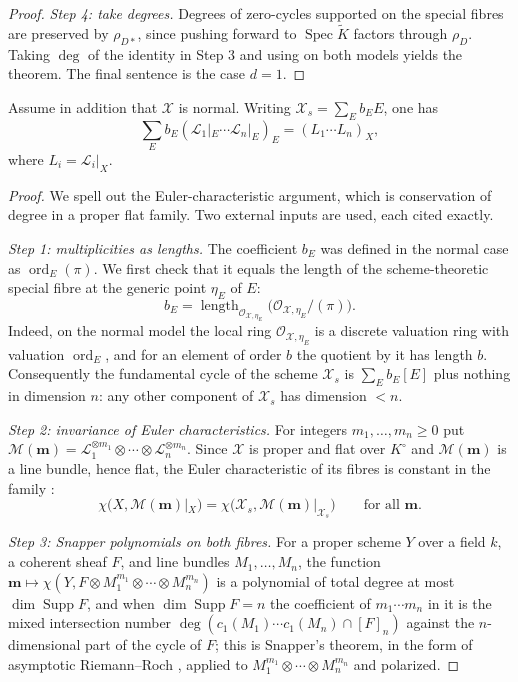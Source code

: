 \begin{proof}
\emph{Step 4: take degrees.}  Degrees of zero-cycles supported on the
special fibres are preserved by $\rho_{D*}$, since pushing forward to
$\operatorname{Spec}\widetilde K$ factors through $\rho_D$.  Taking
$\deg$ of the identity in Step 3 and using
 on both models yields the theorem.
The final sentence is the case $d=1$.
\end{proof}

\begin{proposition}\label{prop:special-fibre-degree-conservation}
Assume in addition that $\mathcal X$ is normal.
Writing $\mathcal X_s=\sum_Eb_EE$, one has
\[
 \sum_Eb_E(\mathcal L_1|_E\cdots\mathcal L_n|_E)_E
   = (L_1\cdots L_n)_X,
\]
where $L_i=\mathcal L_i|_X$.
\end{proposition}
\begin{proof}
We spell out the Euler-characteristic argument, which is conservation of
degree in a proper flat family.  Two external inputs are used, each cited
exactly.

\emph{Step 1: multiplicities as lengths.}  The coefficient $b_E$ was
defined in the normal case as $\operatorname{ord}_E(\pi)$.  We first check
that it equals the length of the scheme-theoretic special fibre at the
generic point $\eta_E$ of $E$:
\[
 b_E=\operatorname{length}_{\mathcal O_{\mathcal X,\eta_E}}
     \bigl(\mathcal O_{\mathcal X,\eta_E}/(\pi)\bigr).
\]
Indeed, on the normal model the local ring $\mathcal O_{\mathcal
X,\eta_E}$ is a discrete valuation ring with valuation
$\operatorname{ord}_E$, and for an element of order $b$ the quotient by it
has length $b$.  Consequently the fundamental cycle of the scheme
$\mathcal X_s$ is $\sum_Eb_E[E]$ plus nothing in dimension $n$: any other
component of $\mathcal X_s$ has dimension $<n$.

\emph{Step 2: invariance of Euler characteristics.}  For integers
$m_1,\ldots,m_n\geq0$ put
$\mathcal M(\mathbf m)=\mathcal L_1^{\otimes m_1}\otimes\cdots\otimes
\mathcal L_n^{\otimes m_n}$.  Since $\mathcal X$ is proper and flat over
$K^\circ$ and $\mathcal M(\mathbf m)$ is a line bundle, hence flat, the
Euler characteristic of its fibres is constant in the family
\cite[7.9.4]{EGAIII2}:
\[
   \chi\bigl(X,\mathcal M(\mathbf m)|_X\bigr)
   =\chi\bigl(\mathcal X_s,\mathcal M(\mathbf m)|_{\mathcal X_s}\bigr)
   \qquad\text{for all }\mathbf m .
\]

\emph{Step 3: Snapper polynomials on both fibres.}  For a proper scheme
$Y$ over a field $k$, a coherent sheaf $F$, and line bundles
$M_1,\ldots,M_n$, the function
$\mathbf m\mapsto\chi(Y,F\otimes M_1^{m_1}\otimes\cdots\otimes M_n^{m_n})$
is a polynomial of total degree at most $\dim\operatorname{Supp}F$, and
when $\dim\operatorname{Supp}F=n$ the coefficient of $m_1\cdots m_n$ in it
is the mixed intersection number
$\deg(c_1(M_1)\cdots c_1(M_n)\cap[F]_n)$ against the $n$-dimensional part
of the cycle of $F$; this is Snapper's theorem, in the form of asymptotic
Riemann--Roch \cite[Example~18.3.6]{Ful}, applied to
$M_1^{m_1}\otimes\cdots\otimes M_n^{m_n}$ and polarized.


\end{proof}
